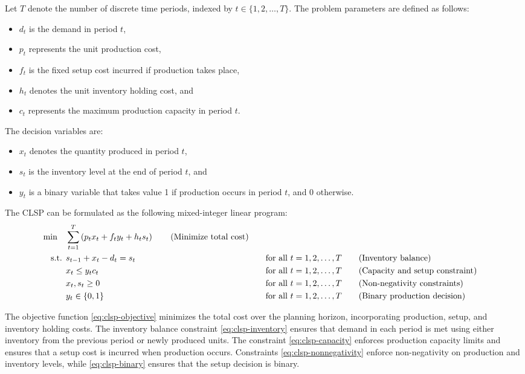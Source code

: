 Let \( T \) denote the number of discrete time periods, indexed by \( t \in \{1,2,\dots,T\} \). The problem parameters are defined as follows:
\begin{itemize}
    \item \( d_t \) is the demand in period \( t \),
    \item \( p_t \) represents the unit production cost,
    \item \( f_t \) is the fixed setup cost incurred if production takes place,
    \item \( h_t \) denotes the unit inventory holding cost, and
    \item \( c_t \) represents the maximum production capacity in period \( t \).
\end{itemize}

The decision variables are:
\begin{itemize}
    \item \( x_t \) denotes the quantity produced in period \( t \),
    \item \( s_t \) is the inventory level at the end of period \( t \), and
    \item \( y_t \) is a binary variable that takes value 1 if production occurs in period \( t \), and 0 otherwise.
\end{itemize}

The CLSP can be formulated as the following mixed-integer linear program:
\begin{align}
\min \quad & \sum_{t=1}^{T} \left( p_t x_t + f_t y_t + h_t s_t \right)   \tag{Minimize total cost}\label{eq:clsp-objective} \\
\mbox{ s.t. }        & s_{t-1} + x_t - d_t = s_t &&\quad \mbox{for all } t = 1,2,\dots,T   \tag{Inventory balance}\label{eq:clsp-inventory} \\
    & x_t \leq y_t c_t &&\quad \mbox{for all } t = 1,2,\dots,T   \tag{Capacity and setup constraint}\label{eq:clsp-capacity} \\
    & x_t, s_t \geq 0 &&\quad \mbox{for all } t = 1,2,\dots,T   \tag{Non-negativity constraints}\label{eq:clsp-nonnegativity} \\
    & y_t \in \{0,1\} &&\quad \mbox{for all } t = 1,2,\dots,T   \tag{Binary production decision}\label{eq:clsp-binary}
\end{align}

The objective function \eqref{eq:clsp-objective} minimizes the total cost over the planning horizon, incorporating production, setup, and inventory holding costs. The inventory balance constraint \eqref{eq:clsp-inventory} ensures that demand in each period is met using either inventory from the previous period or newly produced units. The constraint \eqref{eq:clsp-capacity} enforces production capacity limits and ensures that a setup cost is incurred when production occurs. Constraints \eqref{eq:clsp-nonnegativity} enforce non-negativity on production and inventory levels, while \eqref{eq:clsp-binary} ensures that the setup decision is binary.

